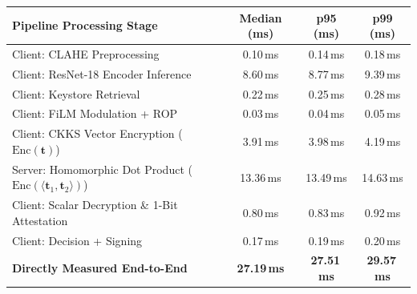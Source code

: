 \begin{tabular}{lccc}
\toprule
\textbf{Pipeline Processing Stage} & \textbf{Median (ms)} & \textbf{p95 (ms)} & \textbf{p99 (ms)} \\
\midrule
Client: CLAHE Preprocessing & 0.10\,ms & 0.14\,ms & 0.18\,ms \\
Client: ResNet-18 Encoder Inference & 8.60\,ms & 8.77\,ms & 9.39\,ms \\
Client: Keystore Retrieval & 0.22\,ms & 0.25\,ms & 0.28\,ms \\
Client: FiLM Modulation + ROP & 0.03\,ms & 0.04\,ms & 0.05\,ms \\
Client: CKKS Vector Encryption ($\text{Enc}(\mathbf{t})$) & 3.91\,ms & 3.98\,ms & 4.19\,ms \\
Server: Homomorphic Dot Product ($\text{Enc}(\langle \mathbf{t}_1, \mathbf{t}_2 \rangle)$) & 13.36\,ms & 13.49\,ms & 14.63\,ms \\
Client: Scalar Decryption \& 1-Bit Attestation & 0.80\,ms & 0.83\,ms & 0.92\,ms \\
Client: Decision + Signing & 0.17\,ms & 0.19\,ms & 0.20\,ms \\
\midrule
\textbf{Directly Measured End-to-End} & \textbf{27.19\,ms} & \textbf{27.51\,ms} & \textbf{29.57\,ms} \\
\bottomrule
\end{tabular}